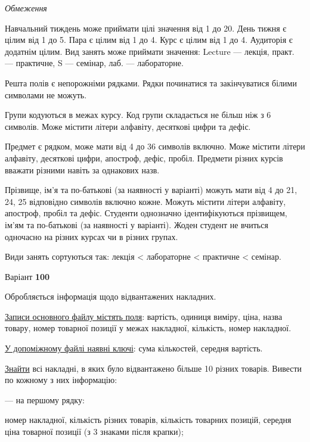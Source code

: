 \documentclass[11pt, ukrainian]{article}
\begin{document}
\bigskip\textit{Обмеження}

Навчальний тиждень може приймати цілі значення від 1 до 20.
День тижня є цілим від 1 до 5. Пара є цілим від 1 до 4.
Курс є цілим від 1 до 4. Аудиторія є додатнім цілим.
Вид занять може приймати значення:
Lecture --- лекція, практ. --- практичне, S --- семінар, лаб. --- лабораторне.

Решта полів є непорожніми рядками.
Рядки починатися та закінчуватися білими символами не можуть.

Групи кодуються в межах курсу.
Код групи складається не більш ніж з 6 символів.
Може містити літери алфавіту, десяткові цифри та дефіс.

Предмет є рядком, може мати від 4 до 36 символів включно.
Може містити літери алфавіту, десяткові цифри, апостроф, дефіс, пробіл.
Предмети різних курсів вважати різними навіть за однакових назв.

Прізвище, ім’я та по-батькові (за наявності у варіанті)
можуть мати від 4 до 21, 24, 25 відповідно символів включно кожне.
Можуть містити літери алфавіту, апостроф, пробіл та дефіс.
Студенти однозначно ідентифікуються прізвищем, ім’ям та по-батькові (за наявності у варіанті).
Жоден студент не вчиться одночасно на різних курсах чи в різних групах.

Види занять сортуються так: лекція < лабораторне < практичне < семінар.





\par
\newpage
{\center Варіант  \No \textbf { 100 }\par}
\bigskip
Обробляється інформація щодо відвантажених накладних.

\underline{Записи основного файлу містять поля}: вартість, одиниця виміру, ціна, назва товару, номер товарної позиції у межах накладної, кількість, номер накладної.

\underline{У допоміжному файлі наявні ключі}: сума кількостей, середня вартість.

\underline{Знайти} всі накладні, в яких було відвантажено більше 10 різних товарів. Вивести по кожному з них інформацію:\par
{\noindent}--- на першому рядку:\par
номер накладної, кількість різних товарів, кількість товарних позицій, середня ціна товарної позиції (з 3 знаками після крапки);
\end{document}
